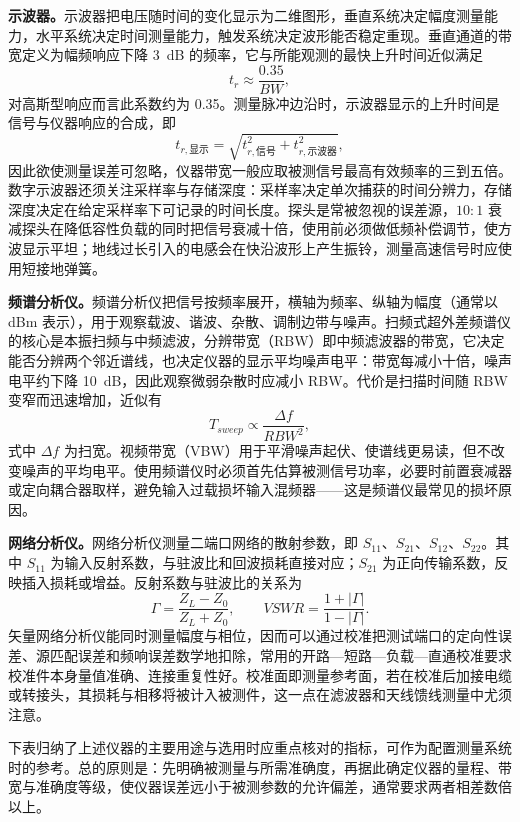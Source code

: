 \textbf{示波器。}示波器把电压随时间的变化显示为二维图形，垂直系统决定幅度测量能力，水平系统决定时间测量能力，触发系统决定波形能否稳定重现。垂直通道的带宽定义为幅频响应下降 3~dB 的频率，它与所能观测的最快上升时间近似满足
\[
t_r \approx \frac{0.35}{BW},
\]
对高斯型响应而言此系数约为 0.35。测量脉冲边沿时，示波器显示的上升时间是信号与仪器响应的合成，即
\[
t_{r,\text{显示}} = \sqrt{t_{r,\text{信号}}^2 + t_{r,\text{示波器}}^2},
\]
因此欲使测量误差可忽略，仪器带宽一般应取被测信号最高有效频率的三到五倍。数字示波器还须关注采样率与存储深度：采样率决定单次捕获的时间分辨力，存储深度决定在给定采样率下可记录的时间长度。探头是常被忽视的误差源，$10:1$ 衰减探头在降低容性负载的同时把信号衰减十倍，使用前必须做低频补偿调节，使方波显示平坦；地线过长引入的电感会在快沿波形上产生振铃，测量高速信号时应使用短接地弹簧。

\textbf{频谱分析仪。}频谱分析仪把信号按频率展开，横轴为频率、纵轴为幅度（通常以 dBm 表示），用于观察载波、谐波、杂散、调制边带与噪声。扫频式超外差频谱仪的核心是本振扫频与中频滤波，分辨带宽（RBW）即中频滤波器的带宽，它决定能否分辨两个邻近谱线，也决定仪器的显示平均噪声电平：带宽每减小十倍，噪声电平约下降 10~dB，因此观察微弱杂散时应减小 RBW。代价是扫描时间随 RBW 变窄而迅速增加，近似有
\[
T_{sweep} \propto \frac{\Delta f}{RBW^2},
\]
式中 $\Delta f$ 为扫宽。视频带宽（VBW）用于平滑噪声起伏、使谱线更易读，但不改变噪声的平均电平。使用频谱仪时必须首先估算被测信号功率，必要时前置衰减器或定向耦合器取样，避免输入过载损坏输入混频器——这是频谱仪最常见的损坏原因。

\textbf{网络分析仪。}网络分析仪测量二端口网络的散射参数，即 $S_{11}$、$S_{21}$、$S_{12}$、$S_{22}$。其中 $S_{11}$ 为输入反射系数，与驻波比和回波损耗直接对应；$S_{21}$ 为正向传输系数，反映插入损耗或增益。反射系数与驻波比的关系为
\[
\Gamma = \frac{Z_L - Z_0}{Z_L + Z_0}, \qquad VSWR = \frac{1 + |\Gamma|}{1 - |\Gamma|}.
\]
矢量网络分析仪能同时测量幅度与相位，因而可以通过校准把测试端口的定向性误差、源匹配误差和频响误差数学地扣除，常用的开路—短路—负载—直通校准要求校准件本身量值准确、连接重复性好。校准面即测量参考面，若在校准后加接电缆或转接头，其损耗与相移将被计入被测件，这一点在滤波器和天线馈线测量中尤须注意。

下表归纳了上述仪器的主要用途与选用时应重点核对的指标，可作为配置测量系统时的参考。总的原则是：先明确被测量与所需准确度，再据此确定仪器的量程、带宽与准确度等级，使仪器误差远小于被测参数的允许偏差，通常要求两者相差数倍以上。

